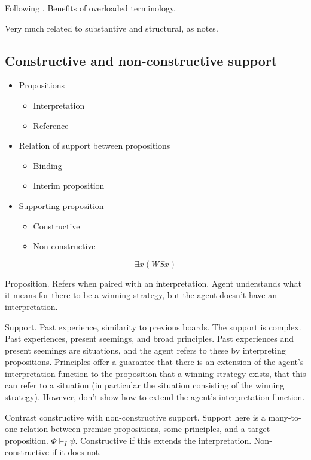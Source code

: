 \documentclass[10pt]{article}
\begin{document}
Following \textcite{Pryor:2018aa}.
Benefits of overloaded terminology.

Very much related to substantive and structural, as \citeauthor{Pryor:2018aa} notes.

\subsection{Constructive and non-constructive support}
\label{sec:constr-non-constr}


\begin{itemize}
\item Propositions
  \begin{itemize}
  \item Interpretation
  \item Reference
  \end{itemize}
\item Relation of support between propositions
  \begin{itemize}
  \item Binding
  \item Interim proposition
  \end{itemize}
\item Supporting proposition
  \begin{itemize}
  \item Constructive
  \item Non-constructive
  \end{itemize}
\end{itemize}


\[\exists x(WSx)\]

Proposition.
Refers when paired with an interpretation.
Agent understands what it means for there to be a winning strategy, but the agent doesn't have an interpretation.

Support.
Past experience, similarity to previous boards.
The support is complex.
Past experiences, present seemings, and broad principles.
Past experiences and present seemings are situations, and the agent refers to these by interpreting propositions.
Principles offer a guarantee that there is an extension of the agent's interpretation function to the proposition that a winning strategy exists, that this can refer to a situation (in particular the situation consisting of the winning strategy).
However, don't show how to extend the agent's interpretation function.

Contrast constructive with non-constructive support.
Support here is a many-to-one relation between premise propositions, some principles, and a target proposition.
\(\Phi \vDash_{I} \psi\).
Constructive if this extends the interpretation.
Non-constructive if it does not.
\end{document}
